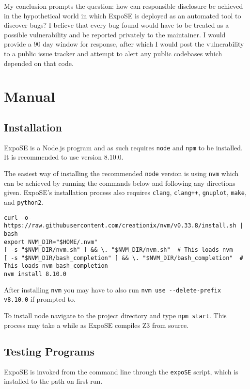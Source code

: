 \documentclass[]{final_report}
\begin{document}
My conclusion prompts the question: how can responsible disclosure be achieved in the hypothetical world in which ExpoSE is deployed as an automated tool to discover bugs? I believe that every bug found would have to be treated as a possible vulnerability and be reported privately to the maintainer. I would provide a 90 day window for response, after which I would post the vulnerability to a public issue tracker and attempt to alert any public codebases which depended on that code.

\section{Manual}

\subsection{Installation}
ExpoSE is a Node.js program and as such requires \lstinline|node| and \lstinline|npm| to be installed. It is recommended to use version 8.10.0. 

The easiest way of installing the recommended \lstinline|node| version is using \lstinline|nvm| which can be achieved by running the commands below and following any directions given. ExpoSE's installation process also requires \lstinline|clang|, \lstinline|clang++|, \lstinline|gnuplot|, \lstinline|make|, and \lstinline|python2|.
\begin{verbatim}
curl -o- https://raw.githubusercontent.com/creationix/nvm/v0.33.8/install.sh | bash
export NVM_DIR="$HOME/.nvm"
[ -s "$NVM_DIR/nvm.sh" ] && \. "$NVM_DIR/nvm.sh"  # This loads nvm
[ -s "$NVM_DIR/bash_completion" ] && \. "$NVM_DIR/bash_completion"  # This loads nvm bash_completion
nvm install 8.10.0
\end{verbatim}

After installing \lstinline|nvm| you may have to also run \lstinline|nvm use --delete-prefix v8.10.0| if prompted to.

To install node navigate to the project directory and type \lstinline|npm start|. This process may take a while as ExpoSE compiles Z3 from source.

\subsection{Testing Programs}
ExpoSE is invoked from the command line through the \lstinline|expoSE| script, which is installed to the path on first run.
\end{document}
